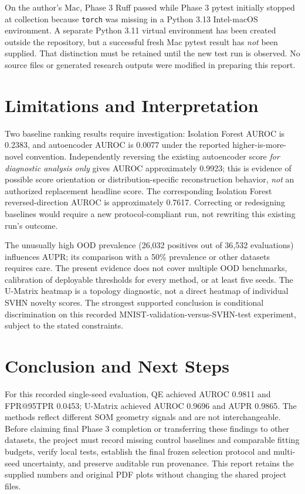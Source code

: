 \documentclass[11pt]{article}
\begin{document}
On the author's Mac, Phase 3 Ruff passed while Phase 3 pytest initially stopped at collection because \texttt{torch} was missing in a Python 3.13 Intel-macOS environment. A separate Python 3.11 virtual environment has been created outside the repository, but a successful fresh Mac pytest result has \emph{not} been supplied. That distinction must be retained until the new test run is observed. No source files or generated research outputs were modified in preparing this report.

\section{Limitations and Interpretation}
Two baseline ranking results require investigation: Isolation Forest AUROC is 0.2383, and autoencoder AUROC is 0.0077 under the reported higher-is-more-novel convention. Independently reversing the existing autoencoder score \emph{for diagnostic analysis only} gives AUROC approximately 0.9923; this is evidence of possible score orientation or distribution-specific reconstruction behavior, \emph{not} an authorized replacement headline score. The corresponding Isolation Forest reversed-direction AUROC is approximately 0.7617. Correcting or redesigning baselines would require a new protocol-compliant run, not rewriting this existing run's outcome.

The unusually high OOD prevalence (26,032 positives out of 36,532 evaluations) influences AUPR; its comparison with a 50\% prevalence or other datasets requires care. The present evidence does not cover multiple OOD benchmarks, calibration of deployable thresholds for every method, or at least five seeds. The U-Matrix heatmap is a topology diagnostic, not a direct heatmap of individual SVHN novelty scores. The strongest supported conclusion is conditional discrimination on this recorded MNIST-validation-versus-SVHN-test experiment, subject to the stated constraints.

\section{Conclusion and Next Steps}
For this recorded single-seed evaluation, QE achieved AUROC 0.9811 and FPR@95TPR 0.0453; U-Matrix achieved AUROC 0.9696 and AUPR 0.9865. The methods reflect different SOM geometry signals and are not interchangeable. Before claiming final Phase 3 completion or transferring these findings to other datasets, the project must record missing control baselines and comparable fitting budgets, verify local tests, establish the final frozen selection protocol and multi-seed uncertainty, and preserve auditable run provenance. This report retains the supplied numbers and original PDF plots without changing the shared project files.

\printbibliography[title={References}]
\end{document}
